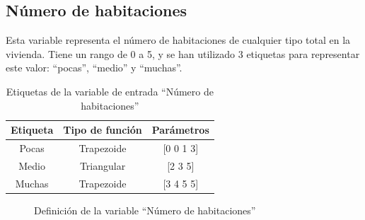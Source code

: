 \documentclass[12pt]{report} %
\begin{document}
        \subsection{Número de habitaciones}
        Esta variable representa el número de habitaciones de cualquier tipo total en la vivienda.
        Tiene un rango de 0 a 5, y se han utilizado 3 etiquetas para representar este valor: ``pocas'', ``medio'' y ``muchas''.

        \begin{table}[h]
            \center
            \begin{tabular}{@{}ccc@{}}
                \toprule
                \textbf{Etiqueta} & \textbf{Tipo de función} & \textbf{Parámetros} \\
                \midrule
                Pocas  & Trapezoide & [0 0 1 3] \\
                Medio  & Triangular & [2 3 5]   \\
                Muchas & Trapezoide & [3 4 5 5] \\
                \bottomrule
            \end{tabular}
            \caption{Etiquetas de la variable de entrada ``Número de habitaciones''}
        \end{table}

        \begin{figure}[H]
            \centering
            \caption{Definición de la variable ``Número de habitaciones''}
        \end{figure}
\end{document}
